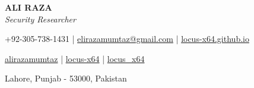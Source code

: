 \documentclass[a4paper,11pt]{article}
\newcommand{\socialicon}[1]{\raisebox{-0.05em}{\resizebox{!}{1em}{#1}}}
\newcommand{\headerfontiii}{\fontfamily{ppl}\selectfont} %
\begin{document}
\headerfontiii

\begin{center}
    {\Huge\textbf{ALI RAZA}}\\
    {\textit{Security Researcher}}
\end{center}
\vspace{-6mm}

\begin{center}
    \small{
    +92-305-738-1431 | \href{mailto:elirazamumtaz@gmail.com}{elirazamumtaz@gmail.com} | 
    \href{https://locus-x64.github.io/}{locus-x64.github.io}
    }
\end{center}
\vspace{-6mm}

\begin{center}
    \small{
    \socialicon{\faLinkedin} \href{https://www.linkedin.com/in/alirazamumtaz/}{alirazamumtaz} | 
    \socialicon{\faGithub} \href{https://github.com/locus-x64}{locus-x64} |
    \socialicon{\faTwitter} \href{https://twitter.com/locus_x64}{locus\_x64}
    }
\end{center}
\vspace{-6mm}
\begin{center}
    \small{Lahore, Punjab - 53000, Pakistan}
\end{center}

\vspace{-4mm}

\end{document}
